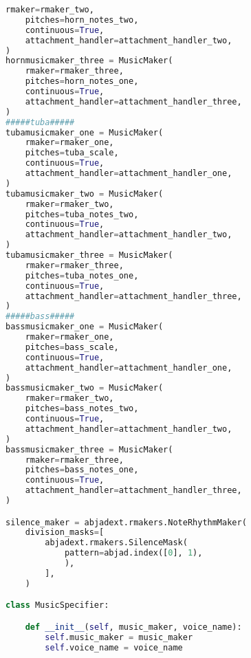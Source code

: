 \begin{lstlisting}[language=Python, caption=Tianshu Segment\_II]
    rmaker=rmaker_two,
    pitches=horn_notes_two,
    continuous=True,
    attachment_handler=attachment_handler_two,
)
hornmusicmaker_three = MusicMaker(
    rmaker=rmaker_three,
    pitches=horn_notes_one,
    continuous=True,
    attachment_handler=attachment_handler_three,
)
#####tuba#####
tubamusicmaker_one = MusicMaker(
    rmaker=rmaker_one,
    pitches=tuba_scale,
    continuous=True,
    attachment_handler=attachment_handler_one,
)
tubamusicmaker_two = MusicMaker(
    rmaker=rmaker_two,
    pitches=tuba_notes_two,
    continuous=True,
    attachment_handler=attachment_handler_two,
)
tubamusicmaker_three = MusicMaker(
    rmaker=rmaker_three,
    pitches=tuba_notes_one,
    continuous=True,
    attachment_handler=attachment_handler_three,
)
#####bass#####
bassmusicmaker_one = MusicMaker(
    rmaker=rmaker_one,
    pitches=bass_scale,
    continuous=True,
    attachment_handler=attachment_handler_one,
)
bassmusicmaker_two = MusicMaker(
    rmaker=rmaker_two,
    pitches=bass_notes_two,
    continuous=True,
    attachment_handler=attachment_handler_two,
)
bassmusicmaker_three = MusicMaker(
    rmaker=rmaker_three,
    pitches=bass_notes_one,
    continuous=True,
    attachment_handler=attachment_handler_three,
)

silence_maker = abjadext.rmakers.NoteRhythmMaker(
    division_masks=[
        abjadext.rmakers.SilenceMask(
            pattern=abjad.index([0], 1),
            ),
        ],
    )

class MusicSpecifier:

    def __init__(self, music_maker, voice_name):
        self.music_maker = music_maker
        self.voice_name = voice_name


\end{lstlisting}
